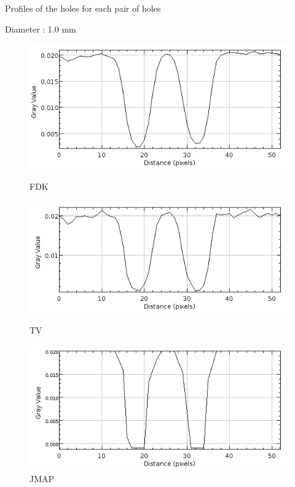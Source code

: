\documentclass[latex]{beamer}
\begin{document}
\begin{frame}{Profiles of the holes for each pair of holes}
\begin{block}{Diameter : 1.0 mm}
\begin{figure}
\begin{minipage}[htb]{0.46\linewidth}
\centering
\includegraphics[scale=0.27]{ProfilsTrousIQICalculResolution/FDK/300proj/ProfilTrousTaille2.png}
\caption*{FDK}
\end{minipage} \hfill
\begin{minipage}[htb]{0.46\linewidth}
\centering
\includegraphics[scale=0.27]{ProfilsTrousIQICalculResolution/TV/300proj/ProfilTrousTaille2.png}
\caption*{TV}
\end{minipage} \vfill
\begin{minipage}[htb]{0.46\linewidth}
\centering
\includegraphics[scale=0.27]{ProfilsTrousIQICalculResolution/JMAPMGINonSplitGamma3K4/300proj/ProfilTrousTaille2.png}
\caption*{JMAP}
\end{minipage}
\end{figure}
\end{block}
\end{frame}
\end{document}
